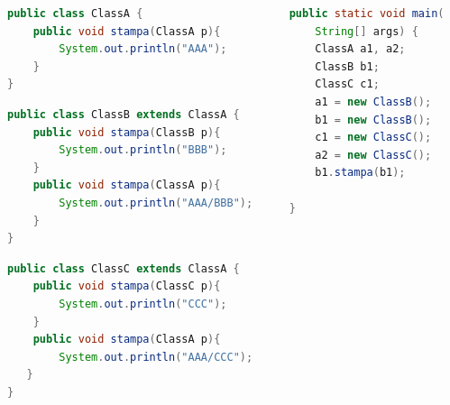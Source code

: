 \documentclass{beamer}
\begin{document}
\begin{frame}[fragile]
\begin{columns}
\begin{column}{0.6\textwidth}
\begin{lstlisting}[language=Java,escapechar=|]
public class ClassA {
    public void stampa(ClassA p){
        System.out.println("AAA");
    }
}
\end{lstlisting}
\begin{lstlisting}[language=Java,escapechar=|]
public class ClassB extends ClassA {
    public void stampa(ClassB p){
        System.out.println("BBB");
    }
    public void stampa(ClassA p){
        System.out.println("AAA/BBB");
    }
}
\end{lstlisting}
\begin{lstlisting}[language=Java,escapechar=|]
public class ClassC extends ClassA {
    public void stampa(ClassC p){
        System.out.println("CCC");
    }
    public void stampa(ClassA p){
        System.out.println("AAA/CCC");
   }
}
\end{lstlisting}
\end{column}
\begin{column}{0.4\textwidth}
\begin{lstlisting}[language=Java,escapechar=|]
public static void main(
    String[] args) {
    ClassA a1, a2;
    ClassB b1;
    ClassC c1;
    a1 = new ClassB();
    b1 = new ClassB();
    c1 = new ClassC();
    a2 = new ClassC();
    b1.stampa(b1); 
   
}
\end{lstlisting}
\end{column}
\end{columns}
\end{frame}
\end{document}
